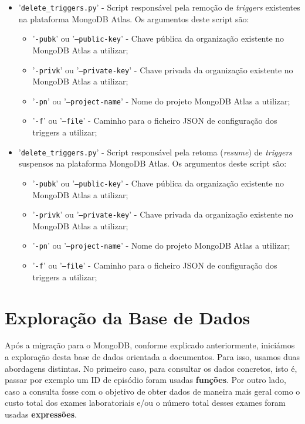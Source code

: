 \begin{itemize}
    \item '\texttt{delete\_triggers.py}' - Script responsável pela remoção de \textit{triggers} existentes na plataforma MongoDB Atlas. Os argumentos deste script são:
        \begin{itemize}
            \item '\texttt{-pubk}' ou '\texttt{--public-key}' - Chave pública da organização existente no MongoDB Atlas a utilizar;
            \item '\texttt{-privk}' ou '\texttt{--private-key}' - Chave privada da organização existente no MongoDB Atlas a utilizar;
            \item '\texttt{-pn}' ou '\texttt{--project-name}' - Nome do projeto MongoDB Atlas a utilizar;
            \item '\texttt{-f}' ou '\texttt{--file}' - Caminho para o ficheiro JSON de configuração dos triggers a utilizar;
        \end{itemize}
        
    \item '\texttt{delete\_triggers.py}' - Script responsável pela retoma (\textit{resume}) de \textit{triggers} suspensos na plataforma MongoDB Atlas. Os argumentos deste script são:
        \begin{itemize}
            \item '\texttt{-pubk}' ou '\texttt{--public-key}' - Chave pública da organização existente no MongoDB Atlas a utilizar;
            \item '\texttt{-privk}' ou '\texttt{--private-key}' - Chave privada da organização existente no MongoDB Atlas a utilizar;
            \item '\texttt{-pn}' ou '\texttt{--project-name}' - Nome do projeto MongoDB Atlas a utilizar;
            \item '\texttt{-f}' ou '\texttt{--file}' - Caminho para o ficheiro JSON de configuração dos triggers a utilizar;
        \end{itemize}
\end{itemize}

\section{Exploração da Base de Dados}
Após a migração para o MongoDB, conforme explicado anteriormente, iniciámos a exploração desta base de dados orientada a documentos. Para isso, usamos duas abordagens distintas. No primeiro caso, para consultar os dados concretos, isto é, passar por exemplo um ID de episódio foram usadas \textbf{funções}. Por outro lado, caso a consulta fosse com o objetivo de obter dados de maneira mais geral como o custo total dos exames laboratoriais e/ou o número total desses exames foram usadas \textbf{expressões}.

